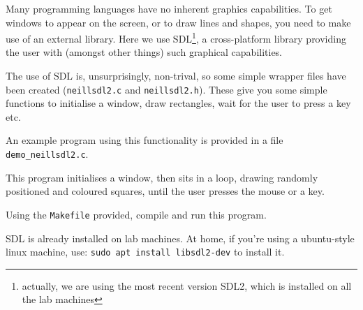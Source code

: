 
Many programming languages have no inherent graphics capabilities.
To get windows to appear on the screen, or to draw lines and shapes,
you need to make use of an external library. Here we use SDL\footnote{
actually, we are using the most recent version SDL2, which is installed
on all the lab machines}, a cross-platform library providing the user with
(amongst other things) such graphical capabilities.


The use of SDL is, unsurprisingly, non-trival, so some simple wrapper
files have been created (\verb^neillsdl2.c^ and \verb^neillsdl2.h^).
These give you some simple functions to initialise a window, draw
rectangles, wait for the user to press a key etc.

An example program using this functionality is
provided in a file \verb^demo_neillsdl2.c^.

This program initialises a window, then sits in a loop, drawing
randomly positioned and coloured squares, until the
user presses the mouse or a key. 

\begin{exercise}
Using the \verb^Makefile^ provided, compile and run this program.

SDL is already installed on lab machines. At home, if you're using a
ubuntu-style linux machine, use: \verb^sudo apt install libsdl2-dev^
to install it.
\end{exercise}
